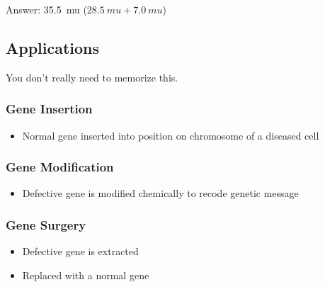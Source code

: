 \documentclass[a4paper,12pt]{article}
\begin{document}
Answer: \SI{35.5}{mu} ($\SI{28.5}{mu} + \SI{7.0}{mu}$)

\subsection{Applications}
You don't really need to memorize this.

\subsubsection{Gene Insertion}
\begin{itemize}
    \item{Normal gene inserted into position on chromosome of a diseased cell}
\end{itemize}

\subsubsection{Gene Modification}
\begin{itemize}
    \item{Defective gene is modified chemically to recode genetic message}
\end{itemize}

\subsubsection{Gene Surgery}
\begin{itemize}
    \item{Defective gene is extracted}
    \item{Replaced with a normal gene}
\end{itemize}
\end{document}
